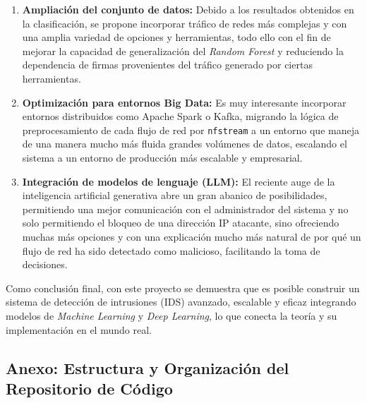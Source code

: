 \documentclass[12pt]{article}
\numberwithin{equation}{section} %
\begin{document}
    \begin{enumerate}
        \item \textbf{Ampliación del conjunto de datos:} Debido a los resultados obtenidos en la clasificación, se propone incorporar tráfico de redes más complejas y con una amplia variedad de opciones y herramientas, todo ello con el fin de mejorar la capacidad de generalización del \textit{Random Forest} y reduciendo la dependencia de firmas provenientes del tráfico generado por ciertas herramientas.
        
        \vspace{5mm}
        
        \item \textbf{Optimización para entornos Big Data:} Es muy interesante incorporar entornos distribuidos como Apache Spark o Kafka, migrando la lógica de preprocesamiento de cada flujo de red por \texttt{nfstream} a un entorno que maneja de una manera mucho más fluida grandes volúmenes de datos, escalando el sistema a un entorno de producción más escalable y empresarial.
        
        \vspace{5mm}

        \item \textbf{Integración de modelos de lenguaje (LLM):} El reciente auge de la inteligencia artificial generativa abre un gran abanico de posibilidades, permitiendo una mejor comunicación con el administrador del sistema y no solo permitiendo el bloqueo de una dirección IP atacante, sino ofreciendo muchas más opciones y con una explicación mucho más natural de por qué un flujo de red ha sido detectado como malicioso, facilitando la toma de decisiones.
        
    \end{enumerate}

    \vspace{5mm}

    Como conclusión final, con este proyecto se demuestra que es posible construir un sistema de detección de intrusiones (IDS) avanzado, escalable y eficaz integrando modelos de \textit{Machine Learning} y \textit{Deep Learning}, lo que conecta la teoría y su implementación en el mundo real.

    \vspace{10mm}





    \subsection{Anexo: Estructura y Organización del Repositorio de Código}\label{subsec:anexo_repositorio}
\end{document}
